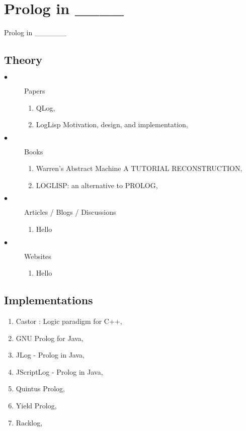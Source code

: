 \documentclass[thesis-solanki.tex]{subfiles}
\begin{document}
\chapter{Prolog in \_\_\_\_ }\label{chap:prologin}

Prolog in \_\_\_\_\_\_
\section{Theory}
\begin{description}

\item[$\bullet$] Papers
\begin{enumerate}
\item QLog, \cite{komorowski1982qlog}
\item LogLisp Motivation, design, and implementation, \cite{robinson1982loglisp} 
\end{enumerate}

\item[$\bullet$] Books
\begin{enumerate}
\item Warren’s Abstract Machine A TUTORIAL RECONSTRUCTION, \cite{ait1999warren}
\item LOGLISP: an alternative to PROLOG, \cite{robinson1980loglisp}
\end{enumerate}

\item[$\bullet$] Articles / Blogs / Discussions
\begin{enumerate}
\item Hello
\end{enumerate}


\item[$\bullet$] Websites
\begin{enumerate}
\item Hello
\end{enumerate}

\end{description}

\section{Implementations}
\begin{enumerate}
\item Castor : Logic paradigm for C++, \cite{castorc++}
\item GNU Prolog for Java, \cite{gnuprolog}
\item JLog - Prolog in Java, \cite{jlog}
\item JScriptLog - Prolog in Java, \cite{jscriptlog}
\item  Quintus Prolog, \cite{quintusprolog}
\item Yield Prolog, \cite{yieldprolog}
\item Racklog, \cite{racklog}
\end{enumerate}
\end{document}
